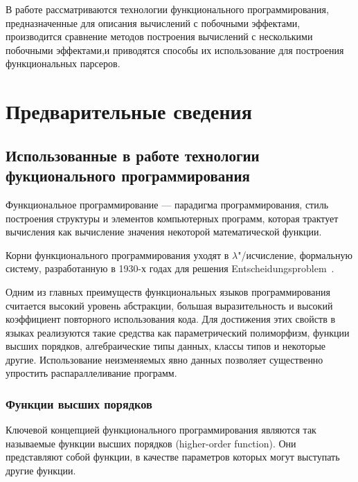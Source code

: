 





\Intro
В работе рассматриваются технологии функционального программирования, предназначенные для описания вычислений с побочными эффектами, производится сравнение методов построения вычислений с несколькими побочными эффектами,и приводятся способы их использование для построения функциональных парсеров.

\section{Предварительные сведения}

\subsection{Использованные в работе технологии фукционального программирования}

Функциональное программирование --- парадигма программирования, стиль построения структуры и элементов компьютерных программ, которая трактует вычисления как вычисление значения некоторой математической функции.

Корни функционального программирования уходят в $\lambda$"/исчисление, формальную систему, разработанную в 1930-х годах для решения Entscheidungsproblem~\autocite{Entscheidungsproblem}.

Одним из главных преимуществ функциональных языков программирования считается высокий уровень абстракции, большая выразительность и высокий коэффициент повторного использования кода. Для достижения этих свойств в языках реализуются такие средства как параметрический полиморфизм, функции высших порядков, алгебраические типы данных, классы типов и некоторые другие. Использование неизменяемых явно данных позволяет существенно упростить распараллеливание программ.

\subsubsection{Функции высших порядков}
Ключевой концепцией функционального программирования являются так называемые функции высших порядков (higher-order function). Они представляют собой функции, в качестве параметров которых могут выступать другие функции.


